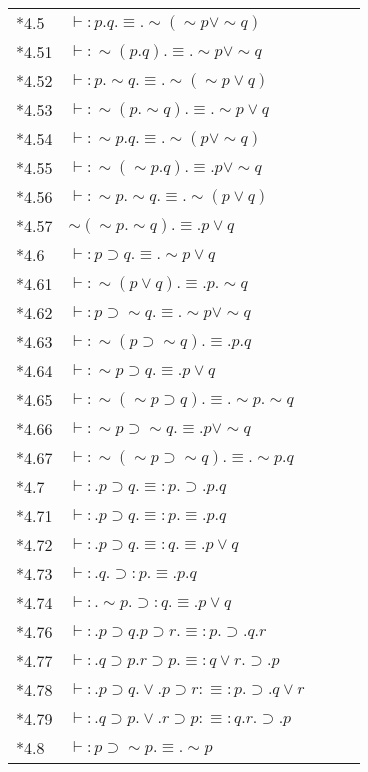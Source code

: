 \noindent\begin{tabular}[t]{l@{\quad}l@{\quad}l@{\quad}ll}
{*4.5} & $\vdash:p.q.\equiv.\sim(\sim{p}\vee\sim{q})$\\
{*4.51} & $\vdash:\sim(p.q).\equiv.\sim{p}\vee\sim{q}$\\
{*4.52} & $\vdash:p.\sim{q}.\equiv.\sim(\sim{p}\vee{q})$\\
{*4.53} & $\vdash:\sim(p.\sim{q}).\equiv.\sim{p}\vee{q}$\\
{*4.54} & $\vdash:\sim{p}.q.\equiv.\sim(p\vee\sim{q})$\\
{*4.55} & $\vdash:\sim(\sim{p}.q).\equiv.p\vee\sim{q}$\\
{*4.56} & $\vdash:\sim{p}.\sim{q}.\equiv.\sim(p\vee{q})$\\
{*4.57} & $\sim(\sim{p}.\sim{q}).\equiv.p\vee{q}$\\
{*4.6} & $\vdash:p\supset{q}.\equiv.\sim{p}\vee{q}$\\
{*4.61} & $\vdash:\sim(p\vee{q}).\equiv.p.\sim{q}$\\
{*4.62} & $\vdash:p\supset\sim{q}.\equiv.\sim{p}\vee\sim{q}$\\
{*4.63} & $\vdash:\sim(p\supset\sim{q}).\equiv.p.q$\\
{*4.64} & $\vdash:\sim{p}\supset{q}.\equiv.p\vee{q}$\\
{*4.65} & $\vdash:\sim(\sim{p}\supset{q}).\equiv.\sim{p}.\sim{q}$\\
{*4.66} & $\vdash:\sim{p}\supset\sim{q}.\equiv.p\vee\sim{q}$\\
{*4.67} & $\vdash:\sim(\sim{p}\supset\sim{q}).\equiv.\sim{p}.q$\\
{*4.7} & $\vdash:.p\supset{q}.\equiv:p.\supset.p.q$\\
{*4.71} & $\vdash:.p\supset{q}.\equiv:p.\equiv.p.q$\\
{*4.72} & $\vdash:.p\supset{q}.\equiv:q.\equiv.p\vee{q}$\\
{*4.73} & $\vdash:.q.\supset:p.\equiv.p.q$\\
{*4.74} & $\vdash:.\sim{p}.\supset:q.\equiv.p\vee{q}$\\
{*4.76} & $\vdash:.p\supset{q}.p\supset{r}.\equiv:p.\supset.q.r$\\
{*4.77} & $\vdash:.q\supset{p}.r\supset{p}.\equiv:q\vee{r}.\supset.p$\\
{*4.78} & $\vdash:.p\supset{q}.\vee.p\supset{r}:\equiv:p.\supset.q\vee{r}$\\
{*4.79} & $\vdash:.q\supset{p}.\vee.r\supset{p}:\equiv:q.r.\supset.p$\\
{*4.8} & $\vdash:p\supset\sim{p}.\equiv.\sim{p}$\\

\end{tabular}
